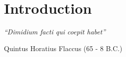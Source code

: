 
%
%
%
\chapter*{Introduction}
\setcounter{page}{1}

\hfill
\begin{minipage}{8cm}
{\it 
``Dimidium facti qui coepit habet''}

\hfill Quintus Horatius Flaccus (65 - 8 B.C.)
\end{minipage}